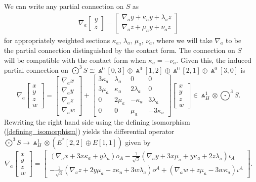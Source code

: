 \documentclass[10pt,a4paper]{amsart}
\numberwithin{equation}{section}
\begin{document}
We can write any partial connection on $S$ as
\begin{gather*}%
\nabla_{a} \begin{bmatrix}
y \\
z
\end{bmatrix}
= \begin{bmatrix}
\nabla_{a} y + \kappa_{a}y + \lambda_{a}z \\
\nabla_{a} z + \mu_{a} y + \nu_{a} z
\end{bmatrix}
\end{gather*}
for appropriately weighted sections $\kappa_{a}$, $\lambda_{a}$, $\mu_{a}$,
$\nu_{a}$, where we will take $\nabla_a$ to be the partial connection
distinguished by the contact form. The connection on $S$ will be compatible
with the contact form when $\kappa_{a} = -\nu_{a}$. Given this, the induced
partial connection on $\bigodot^3\!S \cong \Wedge^0[0,3] \oplus \Wedge^0[1,2]
\oplus \Wedge^0[2,1] \oplus \Wedge^0[3,0] $ is
\[\textstyle
\nabla_{a}
\begin{bmatrix}
x \\
y \\
z \\
w
\end{bmatrix} =
\begin{bmatrix}
\nabla_{a}x \\
\nabla_{a}y \\
\nabla_{a}z \\
\nabla_{a}w
\end{bmatrix} +
\begin{bmatrix}
3\kappa_{a} & \lambda_{a} & 0 & 0 \\
3\mu_{a}& \kappa_{a}& 2\lambda_{a}& 0 \\
0 & 2\mu_{a} & -\kappa_{a} & 3\lambda_{a}\\
0 & 0 & \mu_{a}& -3\kappa_{a}
\end{bmatrix}\begin{bmatrix}
x \\
y \\
z \\
w
\end{bmatrix} \in \Wedge_H^1 \otimes \bigodot^3\!S.
\]
Rewriting the right hand side using the defining isomorphism
(\ref{defining_isomorphism}) yields the differential operator
$\bigodot^3\!S \to \Wedge_H^1 \otimes (E^*[2,2] \oplus E[1,1])$ given by
\[\nabla_{a}
\begin{bmatrix}
x \\
y \\
z \\
w
\end{bmatrix} = \begin{bmatrix}
(\nabla_{a}x + 3x\kappa_{a} +
y\lambda_{a})o_A-\frac{1}{\sqrt{3}}(\nabla_{a}y +
3x\mu_{a} + y\kappa_{a} + 2z\lambda_{a})\iota_A \\[5pt]
-\frac{1}{\sqrt{3}}(\nabla_{a}z +
2y\mu_{a} - z\kappa_{a} + 3w\lambda_{a})o^A + (\nabla_{a}w
+ z\mu_{a} - 3w\kappa_{a})\iota^A
\end{bmatrix}.\]
\end{document}
